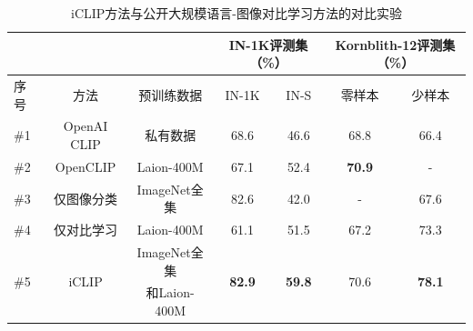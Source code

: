 

\begin{table}
  \centering
    \caption{iCLIP方法与公开大规模语言-图像对比学习方法的对比实验}
  \begin{tabular}{lcccccc}
    \toprule
    \multicolumn{1}{c}{} & \multicolumn{1}{c}{} & \multicolumn{1}{c}{} & \multicolumn{2}{c}{IN-1K评测集（\%）} &
    \multicolumn{2}{c}{Kornblith-12评测集（\%）} \\
    \midrule
    序号 & 方法 & 预训练数据 & IN-1K & IN-S & 零样本 & 少样本\\
    \midrule
    \#1 & OpenAI CLIP & 私有数据 & 68.6 & 46.6 & 68.8 & 66.4 \\
    
    \#2 & OpenCLIP & Laion-400M & 67.1 & 52.4 & \textbf{70.9} & -\\ %
 
    \midrule
    \#3 & 仅图像分类 & ImageNet全集 & 82.6 & 42.0 & - & 67.6 \\
    \#4 & 仅对比学习 & Laion-400M & 61.1 & 51.5 & 67.2 & 73.3 \\
    \multirow{2}{*}{\#5} & \multirow{2}{*}{iCLIP} & ImageNet全集 & \multirow{2}{*}{\textbf{82.9}} & \multirow{2}{*}{\textbf{59.8}} & \multirow{2}{*}{70.6} & \multirow{2}{*}{\textbf{78.1}} \\
    & & 和Laion-400M & & & & \\
    \bottomrule
  \end{tabular}

  \label{tab:iclip-overall-zeroshot}
\end{table}



